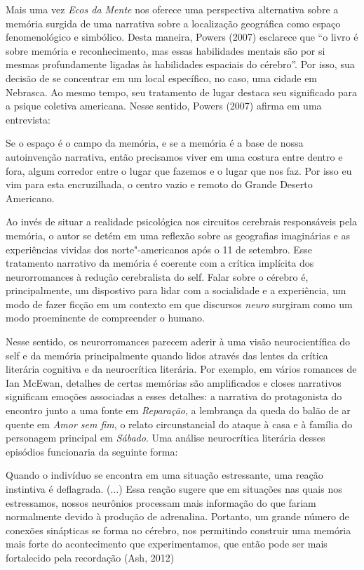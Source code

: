 Mais uma vez \emph{Ecos da Mente} nos oferece uma perspectiva
alternativa sobre a memória surgida de uma narrativa sobre a localização
geográfica como espaço fenomenológico e simbólico. Desta maneira, Powers
(2007) esclarece que ``o livro é sobre memória e reconhecimento, mas
essas habilidades mentais são por si mesmas profundamente ligadas às
habilidades espaciais do cérebro''. Por isso, sua decisão de se
concentrar em um local específico, no caso, uma cidade em Nebrasca. Ao
mesmo tempo, seu tratamento de lugar destaca seu significado para a
psique coletiva americana. Nesse sentido, Powers (2007) afirma em uma
entrevista:

Se o espaço é o campo da memória, e se a memória é a base de nossa
autoinvenção narrativa, então precisamos viver em uma costura entre
dentro e fora, algum corredor entre o lugar que fazemos e o lugar que
nos faz. Por isso eu vim para esta encruzilhada, o centro vazio e remoto
do Grande Deserto Americano.

Ao invés de situar a realidade psicológica nos circuitos cerebrais
responsáveis pela memória, o autor se detém em uma reflexão sobre as
geografias imaginárias e as experiências vividas dos norte"-americanos
após o 11 de setembro. Esse tratamento narrativo da memória é coerente
com a crítica implícita dos neurorromances à redução cerebralista do
self. Falar sobre o cérebro é, principalmente, um dispostivo para lidar
com a socialidade e a experiência, um modo de fazer ficção em um
contexto em que discursos \emph{neuro} surgiram como um modo proeminente
de compreender o humano.

Nesse sentido, os neurorromances parecem aderir à uma visão
neurocientífica do self e da memória principalmente quando lidos através
das lentes da crítica literária cognitiva e da neurocrítica literária.
Por exemplo, em vários romances de Ian McEwan, detalhes de certas
memórias são amplificados e closes narrativos significam emoções
associadas a esses detalhes: a narrativa do protagonista do encontro
junto a uma fonte em \emph{Reparação}, a lembrança da queda do balão de
ar quente em \emph{Amor sem fim}, o relato circunstancial do ataque à
casa e à família do personagem principal em \emph{Sábado}. Uma análise
neurocrítica literária desses episódios funcionaria da seguinte forma:

Quando o indivíduo se encontra em uma situação estressante, uma reação
instintiva é deflagrada. (...) Essa reação sugere que em situações nas
quais nos estressamos, nossos neurônios processam mais informação do que
fariam normalmente devido à produção de adrenalina. Portanto, um grande
número de conexões sinápticas se forma no cérebro, nos permitindo
construir uma memória mais forte do acontecimento que experimentamos,
que então pode ser mais fortalecido pela recordação (Ash, 2012)

